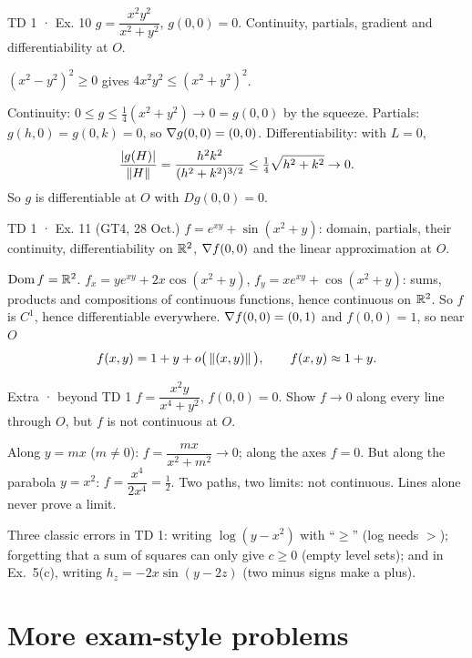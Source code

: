 \begin{problem}{TD 1 · Ex. 10}
$g=\dfrac{x^2y^2}{x^2+y^2}$, $g(0,0)=0$. Continuity, partials, gradient and differentiability at $O$.
\end{problem}
\begin{hint}$(x^2-y^2)^2\ge0$ gives $4x^2y^2\le(x^2+y^2)^2$.\end{hint}
\begin{solution}
Continuity: $0\le g\le\tfrac14(x^2+y^2)\to0=g(0,0)$ by the squeeze. Partials: $g(h,0)=g(0,k)=0$,
so $\nabla g(0,0)=(0,0)$. Differentiability: with $L=0$,
\[
\frac{|g(H)|}{\left\lVert H\right\rVert}=\frac{h^2k^2}{(h^2+k^2)^{3/2}}\le\tfrac14\sqrt{h^2+k^2}\to0 .
\]
So $g$ is differentiable at $O$ with $Dg(0,0)=0$.
\end{solution}

\begin{problem}{TD 1 · Ex. 11 (GT4, 28 Oct.)}
$f=e^{xy}+\sin(x^2+y)$: domain, partials, their continuity, differentiability on $\mathbb{R}^2$,
$\nabla f(0,0)$ and the linear approximation at $O$.
\end{problem}
\begin{solution}
$\operatorname{Dom} f=\mathbb{R}^2$. $f_x=ye^{xy}+2x\cos(x^2+y)$, $f_y=xe^{xy}+\cos(x^2+y)$: sums, products and
compositions of continuous functions, hence continuous on $\mathbb{R}^2$. So $f$ is $C^1$, hence
differentiable everywhere. $\nabla f(0,0)=(0,1)$ and $f(0,0)=1$, so near $O$
\[ f(x,y)=1+y+o\big(\left\lVert (x,y)\right\rVert\big),\qquad f(x,y)\approx 1+y . \]
\end{solution}

\begin{problem}{Extra · beyond TD 1}\label{p:parab}
$f=\dfrac{x^2y}{x^4+y^2}$, $f(0,0)=0$. Show $f\to0$ along every line through $O$, but $f$ is
not continuous at $O$.
\end{problem}
\begin{solution}
Along $y=mx$ ($m\ne0$): $f=\dfrac{mx}{x^2+m^2}\to0$; along the axes $f=0$. But along the
parabola $y=x^2$: $f=\dfrac{x^4}{2x^4}=\tfrac12$. Two paths, two limits: not continuous.
Lines alone never prove a limit.
\end{solution}

\begin{trap}
Three classic errors in TD 1: writing $\log(y-x^2)$ with ``$\ge$'' (log needs $>$); forgetting
that a sum of squares can only give $c\ge0$ (empty level sets); and in Ex.~5(c), writing
$h_z=-2x\sin(y-2z)$ (two minus signs make a plus).
\end{trap}

\section{More exam-style problems}

